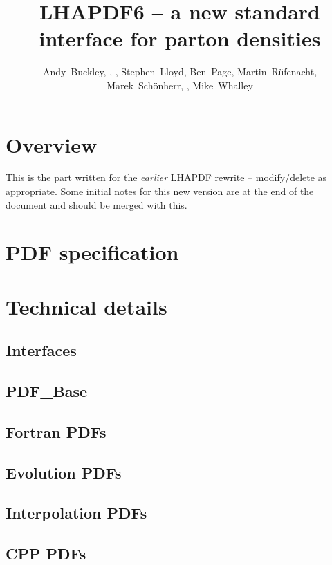 \documentclass{report}
\title {LHAPDF6 -- a new standard interface for parton densities}
\author{Andy~Buckley, \grey{James~Ferrando}, \grey{Karl~Nordstrom},
  Stephen~Lloyd, Ben~Page, Martin~R\"ufenacht, Marek~Sch\"onherr,
  \grey{Graeme~Watt}, Mike~Whalley}
\begin{document}
\maketitle

\chapter{Overview}

This is the part written for the \emph{earlier} LHAPDF rewrite -- modify/delete
as appropriate. Some initial notes for this new version are at the end of the
document and should be merged with this.



\chapter{PDF specification}

\chapter{Technical details}

\section{Interfaces}


\section{PDF\_Base}


\section{Fortran PDFs}


\section{Evolution PDFs}


\section{Interpolation PDFs}


\section{CPP PDFs}

\end{document}
